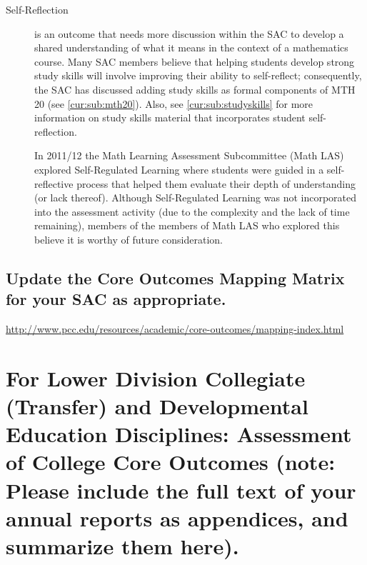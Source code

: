 \begin{description}
\item[Self-Reflection] is an outcome that needs more discussion within the SAC
  to develop a shared understanding of what it means in the context of a
  mathematics course.  Many SAC members believe that helping students develop
  strong study skills will involve improving their ability to self-reflect;
  consequently, the SAC has discussed adding study skills as formal components
  of MTH 20 (see \vref{cur:sub:mth20}).  Also,  see \vref{cur:sub:studyskills}
  for more information on study skills material that incorporates student
  self-reflection. 

In 2011/12 the Math Learning Assessment Subcommittee (Math LAS) explored
Self-Regulated Learning where students were guided in a self-reflective process
that helped them evaluate their depth of understanding (or lack thereof).
Although Self-Regulated Learning was not incorporated into the assessment
activity (due to the complexity and the lack of time remaining), members of the
members of Math LAS who explored this believe it is worthy of future
consideration.

\end{description}

\subsection{Update the Core Outcomes Mapping Matrix for your SAC as
appropriate.}\url{http://www.pcc.edu/resources/academic/core-outcomes/mapping-index.html} 




\section[Assessment of College Core Outcomes]{For Lower Division Collegiate
(Transfer) and Developmental Education Disciplines:  Assessment of College Core
Outcomes    (note:  Please include the full text of your annual reports as
appendices, and summarize them here).  }\label{ass:sec:coreoutcomes}

